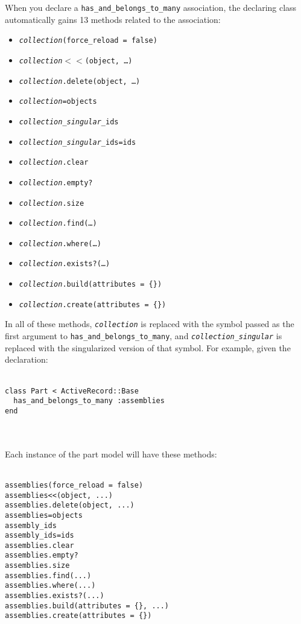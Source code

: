 \documentclass[10pt]{book}
\begin{document}
When you declare a \texttt{has\_and\_belongs\_to\_many} association, the declaring class automatically gains 13 methods related to the association:
\begin{itemize}
	\item \texttt{\emph{collection}(force\_reload = false)}
	\item \texttt{\emph{collection}$<$$<$(object, …)}
	\item \texttt{\emph{collection}.delete(object, …)}
	\item \texttt{\emph{collection}=objects}
	\item \texttt{\emph{collection\_singular}\_ids}
	\item \texttt{\emph{collection\_singular}\_ids=ids}
	\item \texttt{\emph{collection}.clear}
	\item \texttt{\emph{collection}.empty?}
	\item \texttt{\emph{collection}.size}
	\item \texttt{\emph{collection}.find(…)}
	\item \texttt{\emph{collection}.where(…)}
	\item \texttt{\emph{collection}.exists?(…)}
	\item \texttt{\emph{collection}.build(attributes = \{\})}
	\item \texttt{\emph{collection}.create(attributes = \{\})}
\end{itemize}

In all of these methods, \texttt{\emph{collection}} is replaced with the symbol passed as the first argument to \texttt{has\_and\_belongs\_to\_many}, and \texttt{\emph{collection\_singular}} is replaced with the singularized version of that symbol. For example, given the declaration:
\\ \\
\begin{minipage}{\textwidth}{\scriptsize
\begin{verbatim}
class Part < ActiveRecord::Base
  has_and_belongs_to_many :assemblies
end
\end{verbatim}}
\end{minipage}
\\ \\

Each instance of the part model will have these methods:
\\ \\
\begin{minipage}{\textwidth}{\scriptsize
\begin{verbatim}
assemblies(force_reload = false)
assemblies<<(object, ...)
assemblies.delete(object, ...)
assemblies=objects
assembly_ids
assembly_ids=ids
assemblies.clear
assemblies.empty?
assemblies.size
assemblies.find(...)
assemblies.where(...)
assemblies.exists?(...)
assemblies.build(attributes = {}, ...)
assemblies.create(attributes = {})
\end{verbatim}}
\end{minipage}
\\ \\
\end{document}
